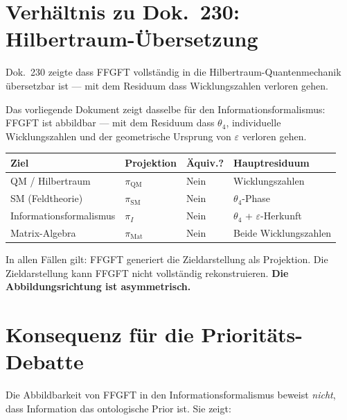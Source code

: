\section{Verhältnis zu Dok.~230: Hilbertraum-Über\-setzung}

Dok.~230 zeigte dass FFGFT vollständig in die Hilbertraum-Quantenmechanik
übersetzbar ist --- mit dem Residuum dass Wicklungszahlen verloren gehen.

Das vorliegende Dokument zeigt dasselbe für den Informationsformalismus:
FFGFT ist abbildbar --- mit dem Residuum dass $\theta_4$, individuelle
Wicklungszahlen und der geometrische Ursprung von $\varepsilon$ verloren gehen.

\begin{center}
\renewcommand{\arraystretch}{1.3}
{\small
\begin{tabular}{p{4.5cm}p{2.5cm}p{1.5cm}p{4.5cm}}
\toprule
\textbf{Ziel} & \textbf{Projektion} & \textbf{Äquiv.?} & \textbf{Hauptresiduum} \\
\midrule
QM / Hilbertraum & $\pi_\text{QM}$ & Nein & Wicklungszahlen \\
SM (Feldtheorie) & $\pi_\text{SM}$ & Nein & $\theta_4$-Phase \\
Informationsformalismus & $\pi_I$ & Nein & $\theta_4$ + $\varepsilon$-Herkunft \\
Matrix-Algebra & $\pi_\text{Mat}$ & Nein & Beide Wicklungszahlen \\
\bottomrule
\end{tabular}
}
\end{center}

In allen Fällen gilt: FFGFT generiert die Zieldarstellung als Projektion.
Die Zieldarstellung kann FFGFT nicht vollständig rekonstruieren.
\textbf{Die Abbildungsrichtung ist asymmetrisch.}

\section{Konsequenz für die Prioritäts-Debatte}

Die Abbildbarkeit von FFGFT in den Informationsformalismus beweist
\emph{nicht}, dass Information das ontologische Prior ist. Sie zeigt:

